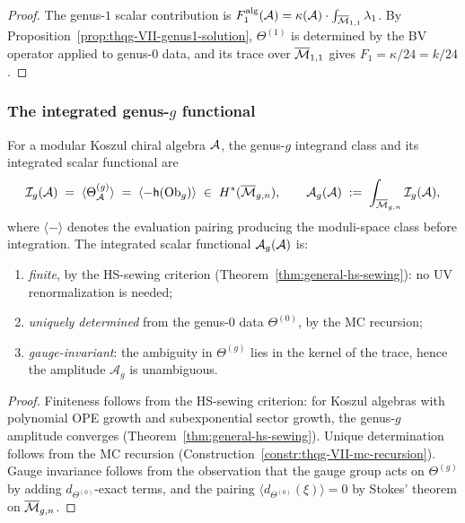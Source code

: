 \begin{proof}
The genus-$1$ scalar contribution is
$F_1^{\mathrm{alg}}(\mathcal{A})=\kappa(\mathcal{A})\cdot
\int_{\overline{\mathcal{M}}_{1,1}} \lambda_1$. By
Proposition~\ref{prop:thqg-VII-genus1-solution},
$\Theta^{(1)}$ is determined by the BV operator applied to
genus-$0$ data, and its trace over $\overline{\mathcal{M}}_{1,1}$
gives $F_1 = \kappa/24 = k/24$.
\end{proof}

\subsubsection{The integrated genus-\texorpdfstring{$g$}{g} functional}
\label{subsubsec:thqg-VII-g-loop}

\begin{theorem}
\label{thm:thqg-VII-g-loop-amplitude}
For a modular Koszul chiral algebra $\mathcal{A}$, the genus-$g$
integrand class and its integrated scalar functional are
\begin{equation}\label{eq:thqg-VII-g-loop}
\mathcal{I}_g(\mathcal{A})
\;=\;
\langle \Theta^{(g)}_{\mathcal{A}} \rangle
\;=\;
\langle -\mathsf{h}(\mathrm{Ob}_g) \rangle
\;\in\;
H^*(\overline{\mathcal{M}}_{g,n}),
\qquad
\mathcal{A}_g(\mathcal{A})
\;:=\;
\int_{\overline{\mathcal{M}}_{g,n}}
\mathcal{I}_g(\mathcal{A}),
\end{equation}
where $\langle - \rangle$ denotes the evaluation pairing producing the
moduli-space class before integration. The integrated scalar
functional $\mathcal{A}_g(\mathcal{A})$ is:
\begin{enumerate}[label=\textup{(\roman*)}]
\item \emph{finite}, by the HS-sewing criterion
 \textup{(}Theorem~\textup{\ref{thm:general-hs-sewing}}):
 no UV renormalization is needed;
\item \emph{uniquely determined} from the genus-$0$ data
 $\Theta^{(0)}$, by the MC recursion;
\item \emph{gauge-invariant}: the ambiguity in $\Theta^{(g)}$
 lies in the kernel of the trace, hence the amplitude
 $\mathcal{A}_g$ is unambiguous.
\end{enumerate}
\end{theorem}

\begin{proof}
Finiteness follows from the HS-sewing criterion: for Koszul
algebras with polynomial OPE growth and subexponential sector
growth, the genus-$g$ amplitude converges
(Theorem~\ref{thm:general-hs-sewing}). Unique determination
follows from the MC recursion
(Construction~\ref{constr:thqg-VII-mc-recursion}). Gauge
invariance follows from the observation that the gauge
group acts on $\Theta^{(g)}$ by adding
$d_{\Theta^{(0)}}$-exact terms, and the pairing
$\langle d_{\Theta^{(0)}}(\xi) \rangle = 0$ by Stokes'
theorem on $\overline{\mathcal{M}}_{g,n}$.
\end{proof}

